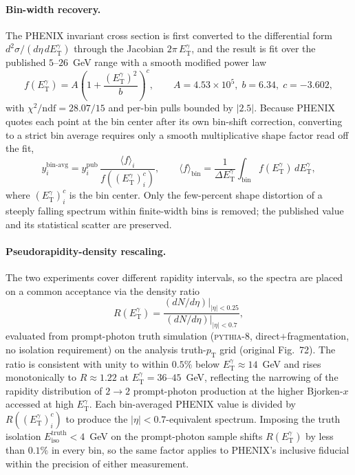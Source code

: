 \documentclass[11pt]{article}
\newcommand{\ETg}{E_{\mathrm{T}}^{\gamma}}
\newcommand{\Eiso}{E_{\mathrm{iso}}}
\newcommand{\pt}{p_{\mathrm{T}}}
\begin{document}
\paragraph{Bin-width recovery.} The PHENIX invariant cross section is first
converted to the differential form $d^2\sigma/(d\eta\,d\ETg)$ through the Jacobian
$2\pi\,\ETg$, and the result is fit over the published $5$--$26$~GeV range with a
smooth modified power law
\begin{equation}
  f(\ETg) = A\left(1 + \frac{(\ETg)^{2}}{b}\right)^{c},
  \qquad A=4.53\times10^{5},\; b=6.34,\; c=-3.602,
\end{equation}
with $\chi^2/\mathrm{ndf}=28.07/15$ and per-bin pulls bounded by $|2.5|$. Because
PHENIX quotes each point at the bin center after its own bin-shift correction,
converting to a strict bin average requires only a smooth multiplicative shape
factor read off the fit,
\begin{equation}
  y_i^{\mathrm{bin\text{-}avg}} = y_i^{\mathrm{pub}}\,
  \frac{\langle f\rangle_i}{f((\ETg)^c_i)},
  \qquad
  \langle f\rangle_{\mathrm{bin}}
  = \frac{1}{\Delta\ETg}\int_{\mathrm{bin}} f(\ETg)\,d\ETg,
\end{equation}
where $(\ETg)^c_i$ is the bin center. Only the few-percent shape distortion of a
steeply falling spectrum within finite-width bins is removed; the published value
and its statistical scatter are preserved.

\paragraph{Pseudorapidity-density rescaling.} The two experiments cover different
rapidity intervals, so the spectra are placed on a common acceptance via the
density ratio
\begin{equation}
  R(\ETg) = \frac{(dN/d\eta)|_{|\eta|<0.25}}{(dN/d\eta)|_{|\eta|<0.7}},
\end{equation}
evaluated from prompt-photon truth simulation (\textsc{pythia-8},
direct$+$fragmentation, no isolation requirement) on the analysis truth-$\pt$
grid (original Fig.~72). The ratio is consistent with unity to within $0.5\%$
below $\ETg\approx14$~GeV and rises monotonically to $R\approx1.22$ at
$\ETg=36$--$45$~GeV, reflecting the narrowing of the rapidity distribution of
$2\to2$ prompt-photon production at the higher Bjorken-$x$ accessed at high
$\ETg$. Each bin-averaged PHENIX value is divided by $R((\ETg)^c_i)$ to produce
the $|\eta|<0.7$-equivalent spectrum. Imposing the truth isolation
$\Eiso^{\mathrm{truth}}<4$~GeV on the prompt-photon sample shifts $R(\ETg)$ by
less than $0.1\%$ in every bin, so the same factor applies to PHENIX's inclusive
fiducial within the precision of either measurement.
\end{document}
